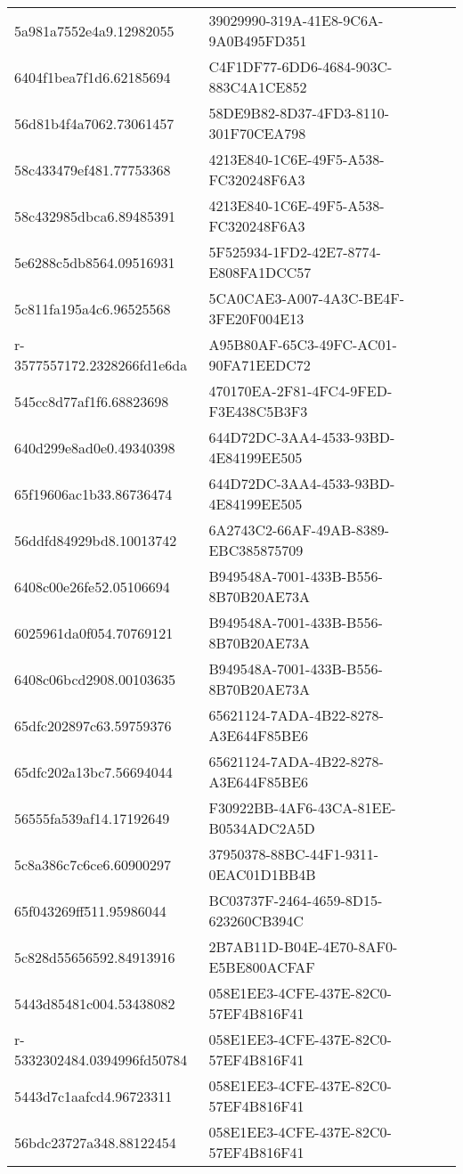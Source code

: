 \begin{tabular}{ll}
5a981a7552e4a9.12982055 & 39029990-319A-41E8-9C6A-9A0B495FD351 \\
6404f1bea7f1d6.62185694 & C4F1DF77-6DD6-4684-903C-883C4A1CE852 \\
56d81b4f4a7062.73061457 & 58DE9B82-8D37-4FD3-8110-301F70CEA798 \\
58c433479ef481.77753368 & 4213E840-1C6E-49F5-A538-FC320248F6A3 \\
58c432985dbca6.89485391 & 4213E840-1C6E-49F5-A538-FC320248F6A3 \\
5e6288c5db8564.09516931 & 5F525934-1FD2-42E7-8774-E808FA1DCC57 \\
5c811fa195a4c6.96525568 & 5CA0CAE3-A007-4A3C-BE4F-3FE20F004E13 \\
r-3577557172.2328266fd1e6da & A95B80AF-65C3-49FC-AC01-90FA71EEDC72 \\
545cc8d77af1f6.68823698 & 470170EA-2F81-4FC4-9FED-F3E438C5B3F3 \\
640d299e8ad0e0.49340398 & 644D72DC-3AA4-4533-93BD-4E84199EE505 \\
65f19606ac1b33.86736474 & 644D72DC-3AA4-4533-93BD-4E84199EE505 \\
56ddfd84929bd8.10013742 & 6A2743C2-66AF-49AB-8389-EBC385875709 \\
6408c00e26fe52.05106694 & B949548A-7001-433B-B556-8B70B20AE73A \\
6025961da0f054.70769121 & B949548A-7001-433B-B556-8B70B20AE73A \\
6408c06bcd2908.00103635 & B949548A-7001-433B-B556-8B70B20AE73A \\
65dfc202897c63.59759376 & 65621124-7ADA-4B22-8278-A3E644F85BE6 \\
65dfc202a13bc7.56694044 & 65621124-7ADA-4B22-8278-A3E644F85BE6 \\
56555fa539af14.17192649 & F30922BB-4AF6-43CA-81EE-B0534ADC2A5D \\
5c8a386c7c6ce6.60900297 & 37950378-88BC-44F1-9311-0EAC01D1BB4B \\
65f043269ff511.95986044 & BC03737F-2464-4659-8D15-623260CB394C \\
5c828d55656592.84913916 & 2B7AB11D-B04E-4E70-8AF0-E5BE800ACFAF \\
5443d85481c004.53438082 & 058E1EE3-4CFE-437E-82C0-57EF4B816F41 \\
r-5332302484.0394996fd50784 & 058E1EE3-4CFE-437E-82C0-57EF4B816F41 \\
5443d7c1aafcd4.96723311 & 058E1EE3-4CFE-437E-82C0-57EF4B816F41 \\
56bdc23727a348.88122454 & 058E1EE3-4CFE-437E-82C0-57EF4B816F41 \\

\end{tabular}
